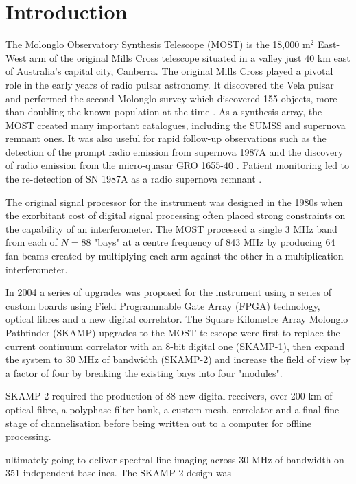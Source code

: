 \section{Introduction} 
The Molonglo Observatory Synthesis Telescope (MOST) is the 18,000 m$^2$ East-West arm of the original Mills Cross telescope situated in a valley just 40 km east of Australia's capital city, Canberra. The original Mills Cross played a pivotal role in the early years of radio pulsar astronomy. It discovered the Vela pulsar \cite{LARGE_1968} and performed the second Molonglo survey which discovered 155 objects, more than doubling the known population at the time \cite{Manchester_1978}. As a synthesis array, the MOST created many important catalogues, including the SUMSS \cite{Bock_1999,Mauch_2003} and supernova remnant \cite{Whiteoak_1996} ones. It was also useful for rapid follow-up observations such as the detection of the prompt radio emission from supernova 1987A \cite{Turtle_1987} and the discovery of radio emission from the micro-quasar GRO 1655-40 \cite{Tingay_1995}. Patient monitoring led to the re-detection of SN 1987A as a radio supernova remnant \cite{Staveley_Smith_1992}.

The original signal processor for the instrument \cite{Robertson_1991} was designed in the 1980s when the exorbitant cost of digital signal processing often placed strong constraints on the capability of an interferometer. The MOST processed a single 3 MHz band from each of $N=88$ "bays" at a centre frequency of 843 MHz by producing 64 fan-beams created by multiplying each arm against the other in a multiplication interferometer. 

In 2004 a series of upgrades was proposed for the instrument using a series of custom boards using Field Programmable Gate Array (FPGA) technology, optical fibres and a new digital correlator. The Square Kilometre Array Molonglo Pathfinder (SKAMP) upgrades to the MOST telescope were first to replace the current continuum correlator with an 8-bit digital one (SKAMP-1), then expand the system to 30 MHz of bandwidth (SKAMP-2) and increase the field of view by a factor of four by breaking the existing bays into four "modules".

SKAMP-2 required the production of 88 new digital receivers, over 200 km of optical fibre, a polyphase filter-bank, a custom mesh, correlator and a final fine stage of channelisation before being written out to a computer for offline processing.



ultimately going to deliver spectral-line imaging across 30 MHz of bandwidth on 351 independent baselines\cite{Adams_2004}. The SKAMP-2 design was 


